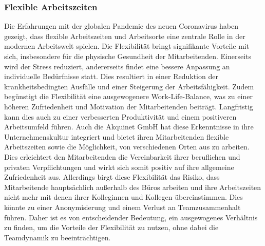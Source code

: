 \subsubsection{Flexible Arbeitszeiten}\label{sec:felxarbeitszeiten}
Die Erfahrungen mit der globalen Pandemie des neuen Coronavirus haben gezeigt, dass flexible Arbeitszeiten und Arbeitsorte eine zentrale Rolle in der modernen Arbeitswelt spielen. Die Flexibilität bringt signifikante Vorteile mit sich, insbesondere für die physische Gesundheit der Mitarbeitenden.\cite{arbeitszeit}\newline
Einerseits wird der Stress reduziert, andererseits findet eine bessere Anpassung an individuelle Bedürfnisse statt. Dies resultiert in einer Reduktion der krankheitsbedingten Ausfälle und einer Steigerung der Arbeitsfähigkeit.\newline
Zudem begünstigt die Flexibilität eine ausgewogenere Work-Life-Balance, was zu einer höheren Zufriedenheit und Motivation der Mitarbeitenden beiträgt.\cite{arbeitszeit} Langfristig kann dies auch zu einer verbesserten Produktivität und einem positiveren Arbeitsumfeld führen. \newline \newline
Auch die Akquinet GmbH hat diese Erkenntnisse in ihre Unternehmenskultur integriert und bietet ihren Mitarbeitenden flexible Arbeitszeiten sowie die Möglichkeit, von verschiedenen Orten aus zu arbeiten. Dies erleichtert den Mitarbeitenden die Vereinbarkeit ihrer beruflichen und privaten Verpflichtungen und wirkt sich somit positiv auf ihre allgemeine Zufriedenheit aus.\newline
Allerdings birgt diese Flexibilität das Risiko, dass Mitarbeitende hauptsächlich außerhalb des Büros arbeiten und ihre Arbeitszeiten nicht mehr mit denen ihrer Kolleginnen und Kollegen übereinstimmen. Dies könnte zu einer Anonymisierung und einem Verlust an Teamzusammenhalt führen. Daher ist es von entscheidender Bedeutung, ein ausgewogenes Verhältnis zu finden, um die Vorteile der Flexibilität zu nutzen, ohne dabei die Teamdynamik zu beeinträchtigen.

